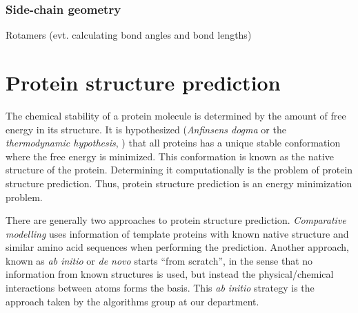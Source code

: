 \documentclass[10pt,a4paper,final,oneside,openany,article,twocolumn]{memoir}
\begin{document}
\subsubsection{Side-chain geometry}
Rotamers (evt. calculating bond angles and bond lengths)

\begin{figure}
  \centering
  \caption{}
\end{figure}

\section{Protein structure prediction}
The chemical stability of a protein molecule is determined by the
amount of free energy in its structure. It is hypothesized
(\textit{Anfinsens dogma} or the \textit{thermodynamic hypothesis},
\cite{anfinsen73, soundararajan2010}) that all proteins has a unique
stable conformation where the free energy is minimized. This
conformation is known as the native structure of the
protein. Determining it computationally is the problem of protein
structure prediction. Thus, protein structure prediction is an energy
minimization problem.


There are generally two approaches to protein structure prediction.
\textit{Comparative modelling} uses information of template proteins
with known native structure and similar amino acid sequences when
performing the prediction. Another approach, known as \textit{ab
  initio} or \textit{de novo} starts ``from scratch'', in the sense
that no information from known structures is used, but instead the
physical/chemical interactions between atoms forms the basis. This
\textit{ab initio} strategy is the approach taken by the algorithms
group at our department.
\end{document}

